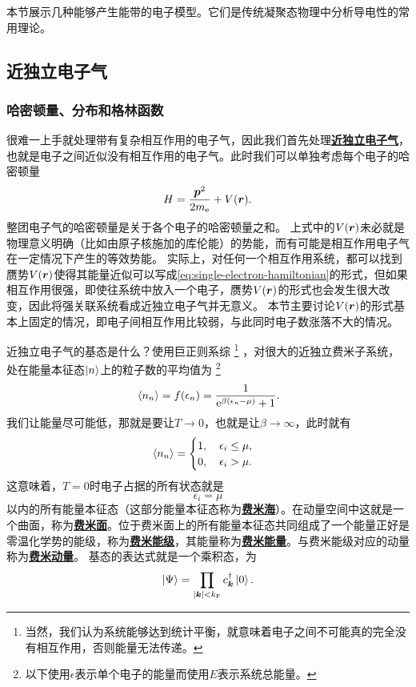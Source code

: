 \documentclass[hyperref, UTF8, a4paper]{ctexart}
\newcommand*{\ee}{\mathrm{e}}
\newcommand*{\concept}[1]{\underline{\textbf{#1}}}
\begin{document}
本节展示几种能够产生能带的电子模型。它们是传统凝聚态物理中分析导电性的常用理论。


\subsection{近独立电子气}

\subsubsection{哈密顿量、分布和格林函数}

很难一上手就处理带有复杂相互作用的电子气，因此我们首先处理\concept{近独立电子气}，也就是电子之间近似没有相互作用的电子气。此时我们可以单独考虑每个电子的哈密顿量
\begin{equation}
    {H} = \frac{{\vb*{p}}^2}{2m_\text{e}} + V(\vb*{r}).
    \label{eq:single-electron-hamiltonian}
\end{equation}
整团电子气的哈密顿量是关于各个电子的哈密顿量之和。
上式中的$V(\vb*{r})$未必就是物理意义明确（比如由原子核施加的库伦能）的势能，而有可能是相互作用电子气在一定情况下产生的等效势能。
实际上，对任何一个相互作用系统，都可以找到赝势$V(\vb*{r})$使得其能量近似可以写成\eqref{eq:single-electron-hamiltonian}的形式，但如果相互作用很强，即使往系统中放入一个电子，赝势$V(\vb*{r})$的形式也会发生很大改变，因此将强关联系统看成近独立电子气并无意义。
本节主要讨论$V(\vb*{r})$的形式基本上固定的情况，即电子间相互作用比较弱，与此同时电子数涨落不大的情况。

近独立电子气的基态是什么？使用巨正则系综%
\footnote{当然，我们认为系统能够达到统计平衡，就意味着电子之间不可能真的完全没有相互作用，否则能量无法传递。}%
，对很大的近独立费米子系统，处在能量本征态$\ket{n}$上的粒子数的平均值为%
\footnote{以下使用$\epsilon$表示单个电子的能量而使用$E$表示系统总能量。}%
\begin{equation}
    \expval*{{n}_n} = f(\epsilon_n) = \frac{1}{\ee^{\beta (\epsilon_n-\mu)} + 1}.
    \label{eq:fermi-dirac-distribution}
\end{equation}
我们让能量尽可能低，那就是要让$T\to 0$，也就是让$\beta\to \infty$，此时就有
\begin{equation}
    \expval*{{n}_n} = \begin{cases}
        1, \quad \epsilon_i \leq \mu, \\
        0, \quad \epsilon_i > \mu.
    \end{cases}
\end{equation}
这意味着，$T=0$时电子占据的所有状态就是
\begin{equation}
    \epsilon_i = \mu
\end{equation}
以内的所有能量本征态（这部分能量本征态称为\concept{费米海}）。在动量空间中这就是一个曲面，称为\concept{费米面}。位于费米面上的所有能量本征态共同组成了一个能量正好是零温化学势的能级，称为\concept{费米能级}，其能量称为\concept{费米能量}。与费米能级对应的动量称为\concept{费米动量}。
基态的表达式就是一个乘积态，为
\begin{equation}
    \ket{\Psi} = \prod_{\abs{\vb*{k}} < k_\text{F}} {c}^\dagger_{\vb*{k}} \ket{0}.
    \label{eq:ground-state}
\end{equation}
\end{document}
